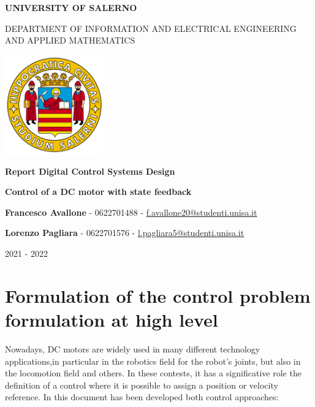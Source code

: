 \documentclass[11pt,a4paper,oneside]{extarticle}
\begin{document}
\begin{titlepage}
	\begin{center}

		\Large \textbf{UNIVERSITY OF SALERNO}
		\vspace{0.5cm}

		\normalsize DEPARTMENT OF INFORMATION AND ELECTRICAL
		ENGINEERING AND APPLIED MATHEMATICS
		\vspace{1.5cm}

		\includegraphics[width=0.32\textwidth]{imgs/unisa.png}
		\vspace*{1.5cm}

		\huge \textbf{Report Digital Control Systems Design}
		\vspace*{1cm}

		\Large \textbf{Control of a DC motor with state feedback}
		\vspace*{2cm}

		\textbf{Francesco Avallone} - 0622701488 -
		\href{mailto:f.avallone20@studenti.unisa.it}
		{f.avallone20@studenti.unisa.it}

		\textbf{Lorenzo Pagliara} - 0622701576 -
		\href{mailto:l.pagliara5@studenti.unisa.it}
		{l.pagliara5@studenti.unisa.it}

		\vspace{\fill}
		2021 - 2022
	\end{center}

\end{titlepage}

\tableofcontents

\newpage
{}

\section{Formulation of the control problem formulation at high level}
Nowadays, DC motors are widely used in many different technology 
applications,in particular in the robotics field for the robot's 
joints, but also in the locomotion field and others.
In these contests, it has a significative role the definition of a 
control where it is possible to assign a position or velocity 
reference.\bigskip
In this document has been developed both control approaches: 
\end{document}
